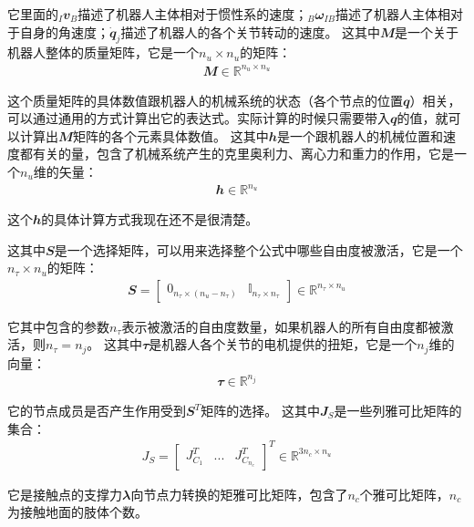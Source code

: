 它里面的$_I{\mathbfit v}_B$描述了机器人主体相对于惯性系的速度；$_B{\mathbfit \omega}_{IB}$描述了机器人主体相对于自身的角速度；$\dot {\mathbfit q}_j$描述了机器人的各个关节转动的速度。
这其中${\mathbfit M}$是一个关于机器人整体的质量矩阵，它是一个$n_u \times n_u$的矩阵： 
\begin{align}
    {\mathbfit M} \in {\mathbb R}^{n_u \times n_u}
\end{align}

这个质量矩阵的具体数值跟机器人的机械系统的状态（各个节点的位置${\mathbfit q}$）相关，可以通过通用的方式计算出它的表达式。实际计算的时候只需要带入${\mathbfit q}$的值，就可以计算出${\mathbfit M}$矩阵的各个元素具体数值。
这其中${\mathbfit h}$是一个跟机器人的机械位置和速度都有关的量，包含了机械系统产生的克里奥利力、离心力和重力的作用，它是一个$n_u$维的矢量：
\begin{align}
    {\mathbfit h} \in {\mathbb R}^{n_u}
\end{align}

\begin{note}
    这个${\mathbfit h}$的具体计算方式我现在还不是很清楚。
\end{note}

这其中${\mathbfit S}$是一个选择矩阵，可以用来选择整个公式中哪些自由度被激活，它是一个$n_{\tau} \times n_u$的矩阵：
\begin{align}
    {\mathbfit S} = \begin{bmatrix}{\mathbfit 0}_{n_{\tau} \times (n_u - n_{\tau})} & {\mathbb I}_{n_{\tau} \times n_{\tau}}\end{bmatrix} \in {\mathbb R}^{n_{\tau} \times n_u} 
\end{align}

它其中包含的参数$n_{\tau}$表示被激活的自由度数量，如果机器人的所有自由度都被激活，则$n_{\tau} = n_j$。
这其中${\mathbfit \tau}$是机器人各个关节的电机提供的扭矩，它是一个$n_j$维的向量：
\begin{align}
    {\mathbfit \tau} \in {\mathbb R}^{n_j} 
\end{align}

它的节点成员是否产生作用受到${\mathbfit S}^T$矩阵的选择。
这其中${\mathbfit J}_S$是一些列雅可比矩阵的集合：
\begin{align}
    J_S=\begin{bmatrix}J^T_{C_1} & ... & J^T_{C_{n_c}}\end{bmatrix}^T  \in {\mathbb R}^{3n_c\times n_u}
\end{align}

它是接触点的支撑力${\mathbfit \lambda}$向节点力转换的矩雅可比矩阵，包含了$n_c$个雅可比矩阵，$n_c$为接触地面的肢体个数。


